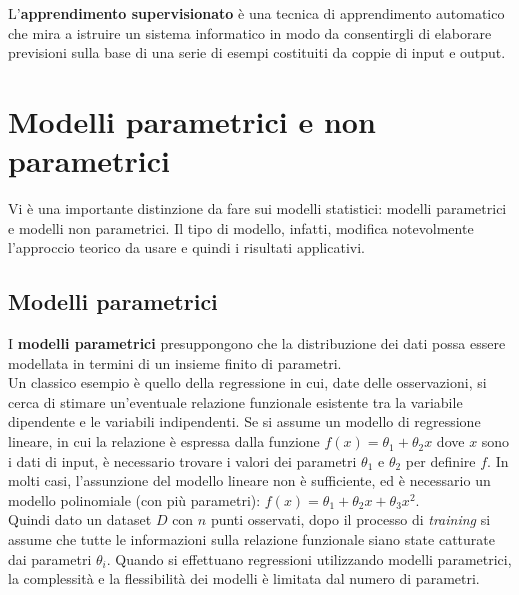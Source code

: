 \begin{defi}
L'\textbf{apprendimento supervisionato} è una tecnica di apprendimento automatico che mira a istruire un sistema informatico in modo da consentirgli di elaborare previsioni sulla base di una serie di esempi costituiti da coppie di input e output.
\end{defi}



\newpage
\section{Modelli parametrici e non parametrici}
Vi è una importante distinzione da fare sui modelli statistici: modelli parametrici e modelli non parametrici. Il tipo di modello, infatti, modifica notevolmente l'approccio teorico da usare e quindi i risultati applicativi. 


\subsection{Modelli parametrici}
I \textbf{modelli parametrici} presuppongono che la distribuzione dei dati possa essere modellata in termini di un insieme finito di parametri.\\
Un classico esempio è quello della regressione in cui, date delle osservazioni, si cerca di stimare un'eventuale relazione funzionale esistente tra la variabile dipendente e le variabili indipendenti. Se si assume un modello di regressione lineare, in cui la relazione è espressa dalla funzione $f(x) = \theta_1 + \theta_2x$ dove $x$ sono i dati di input, è necessario trovare i valori dei parametri $\theta_1$ e $\theta_2$ per definire $f$. In molti casi, l'assunzione del modello lineare non è sufficiente, ed è necessario un modello polinomiale (con più parametri): $f(x) = \theta_1+\theta_2x+\theta_3x^2$.\\
Quindi dato un dataset $D$ con $n$ punti osservati, dopo il processo di \textit{training} si assume che tutte le informazioni sulla relazione funzionale siano state catturate dai parametri $\theta_i$.  Quando si effettuano regressioni utilizzando modelli parametrici, la complessità e la flessibilità dei modelli è limitata dal numero di parametri. 

